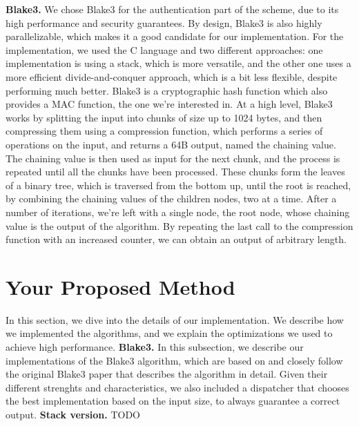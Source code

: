 \documentclass[letterpaper]{article}
\newcommand{\mypar}[1]{{\bf #1.}}
\begin{document}
\mypar{Blake3}
We chose Blake3 for the authentication part of the scheme, due to its high performance and security guarantees.
By design, Blake3 is also highly parallelizable, which makes it a good candidate for our implementation.
For the implementation, we used the C language and two different approaches:
one implementation is using a stack, which is more versatile,
and the other one uses a more efficient divide-and-conquer approach, which is a bit less flexible, despite performing much better.
Blake3 is a cryptographic hash function which also provides a MAC function, the one we're interested in.
At a high level, Blake3 works by splitting the input into chunks of size up to 1024 bytes, and then compressing them using a compression function, which
performs a series of operations on the input, and returns a 64B output, named the chaining value.
The chaining value is then used as input for the next chunk, and the process is repeated until all the chunks have been processed.
These chunks form the leaves of a binary tree, which is traversed from the bottom up, until the root is reached, by combining the chaining values of the children nodes, two at a time.
After a number of iterations, we're left with a single node, the root node, whose chaining value is the output of the algorithm.
By repeating the last call to the compression function with an increased counter, we can obtain an output of arbitrary length.

\section{Your Proposed Method}\label{sec:yourmethod}
In this section, we dive into the details of our implementation. We describe how we implemented the algorithms,
and we explain the optimizations we used to achieve high performance.
%
%
\mypar{Blake3}
In this subsection, we describe our implementations of the Blake3 algorithm, which are based on and closely follow the original Blake3 paper that describes the algorithm in detail.
Given their different strenghts and characteristics, we also included a dispatcher that chooses the best implementation based on the input size, to always guarantee a correct output.
\mypar{Stack version}
TODO
\end{document}
